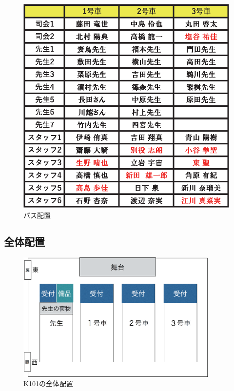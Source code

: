 \begin{figure}[H]
  \begin{center}
    \includegraphics[keepaspectratio, scale=0.9]{./04/bus_memberHaichi2.eps}
    \caption{バス配置}
    \label{fig:bus_memberHaichi2}
  \end{center}
\end{figure}

\subsection{全体配置}
\begin{figure}[H]
  \begin{center}
    \includegraphics[keepaspectratio, width=10cm]{./04/uketsuke_k101Haichi.eps}
    \caption{K101の全体配置}
    \label{fig:uketsuke_k101Haichi}
  \end{center}
\end{figure}


